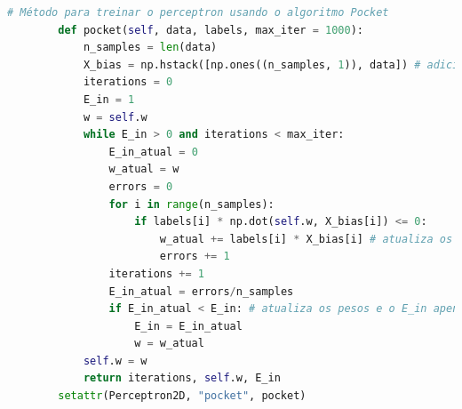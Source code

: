 \begin{enumerate}
    \begin{lstlisting}[language=Python, caption=Algoritmo Pocket, label=cod:pocket]
        # Método para treinar o perceptron usando o algoritmo Pocket
        def pocket(self, data, labels, max_iter = 1000): 
            n_samples = len(data)
            X_bias = np.hstack([np.ones((n_samples, 1)), data]) # adiciona uma coluna de 1s para o X_0 (coordenada artificial)
            iterations = 0
            E_in = 1
            w = self.w
            while E_in > 0 and iterations < max_iter:
                E_in_atual = 0
                w_atual = w
                errors = 0
                for i in range(n_samples):
                    if labels[i] * np.dot(self.w, X_bias[i]) <= 0:
                        w_atual += labels[i] * X_bias[i] # atualiza os pesos
                        errors += 1
                iterations += 1
                E_in_atual = errors/n_samples
                if E_in_atual < E_in: # atualiza os pesos e o E_in apenas se o E_in for menor que o anterior
                    E_in = E_in_atual
                    w = w_atual
            self.w = w
            return iterations, self.w, E_in
        setattr(Perceptron2D, "pocket", pocket)
    \end{lstlisting}


\end{enumerate}
